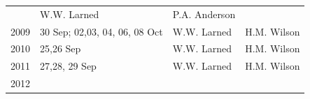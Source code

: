 \documentclass[]{article}
\begin{document}
\begin{longtable}[]{@{}llll@{}}
\begin{minipage}[t]{0.38\columnwidth}
\end{minipage} & \begin{minipage}[t]{0.18\columnwidth}\raggedright\strut
W.W. Larned\strut
\end{minipage} & \begin{minipage}[t]{0.20\columnwidth}\raggedright\strut
P.A. Anderson\strut
\end{minipage}\tabularnewline
\begin{minipage}[t]{0.12\columnwidth}\raggedright\strut
2009\strut
\end{minipage} & \begin{minipage}[t]{0.38\columnwidth}\raggedright\strut
30 Sep; 02,03, 04, 06, 08 Oct\strut
\end{minipage} & \begin{minipage}[t]{0.18\columnwidth}\raggedright\strut
W.W. Larned\strut
\end{minipage} & \begin{minipage}[t]{0.20\columnwidth}\raggedright\strut
H.M. Wilson\strut
\end{minipage}\tabularnewline
\begin{minipage}[t]{0.12\columnwidth}\raggedright\strut
2010\strut
\end{minipage} & \begin{minipage}[t]{0.38\columnwidth}\raggedright\strut
25,26 Sep\strut
\end{minipage} & \begin{minipage}[t]{0.18\columnwidth}\raggedright\strut
W.W. Larned\strut
\end{minipage} & \begin{minipage}[t]{0.20\columnwidth}\raggedright\strut
H.M. Wilson\strut
\end{minipage}\tabularnewline
\begin{minipage}[t]{0.12\columnwidth}\raggedright\strut
2011\strut
\end{minipage} & \begin{minipage}[t]{0.38\columnwidth}\raggedright\strut
27,28, 29 Sep\strut
\end{minipage} & \begin{minipage}[t]{0.18\columnwidth}\raggedright\strut
W.W. Larned\strut
\end{minipage} & \begin{minipage}[t]{0.20\columnwidth}\raggedright\strut
H.M. Wilson\strut
\end{minipage}\tabularnewline
\begin{minipage}[t]{0.12\columnwidth}\raggedright\strut
2012\strut

\end{minipage}
\end{longtable}
\end{document}
